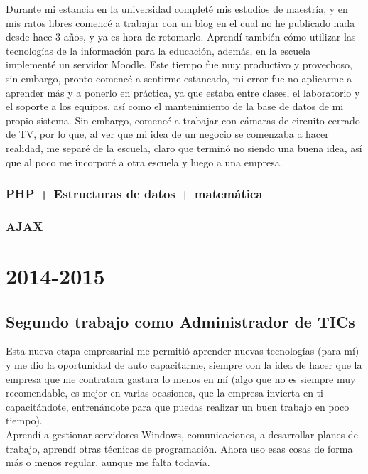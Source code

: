 \documentclass[12pt,spanish,lettersize]{book}
\begin{document}
Durante mi estancia en la universidad completé mis estudios de maestría, y en mis ratos libres comencé a trabajar con un blog en el cual no he publicado nada desde hace 3 años, y ya es hora de retomarlo. Aprendí también cómo utilizar las tecnologías de la información para la educación, además, en la escuela implementé un servidor Moodle. Este tiempo fue muy productivo y provechoso, sin embargo, pronto comencé a sentirme estancado, mi error fue no aplicarme a aprender más y a ponerlo en práctica, ya que estaba entre clases, el laboratorio y el soporte a los equipos, así como el mantenimiento de la base de datos de mi propio sistema. Sin embargo, comencé a trabajar con cámaras de circuito cerrado de TV, por lo que, al ver que mi idea de un negocio se comenzaba a hacer realidad, me separé de la escuela, claro que terminó no siendo una buena idea, así que al poco me incorporé a otra escuela y luego a una empresa.\\
\subsection{PHP + Estructuras de datos + matemática}
\subsection{AJAX}
\chapter{2014-2015}
\section{Segundo trabajo como Administrador de TICs}

Esta nueva etapa empresarial me permitió aprender nuevas tecnologías (para mí) y me dio la oportunidad de auto capacitarme, siempre con la idea de hacer que la empresa que me contratara gastara lo menos en mí (algo que no es siempre muy recomendable, es mejor en varias ocasiones, que la empresa invierta en ti capacitándote, entrenándote para que puedas realizar un buen trabajo en poco tiempo).\\

Aprendí a gestionar servidores Windows, comunicaciones, a desarrollar planes de trabajo, aprendí otras técnicas de programación. Ahora uso esas cosas de forma más o menos regular, aunque me falta todavía.\\
\end{document}
